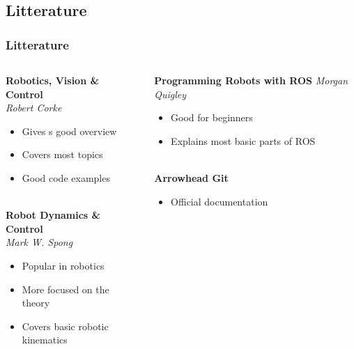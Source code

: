 \documentclass{beamer}
\begin{document}
\begin{frame}
    \subsection{Litterature}
    \frametitle{Litterature}

    \begin{columns}
        \begin{column}[]{0.5\textwidth}
            \textbf{Robotics, Vision \& Control }\\
            \textit{Robert Corke}
            \begin{itemize}
                \item Gives s good overview
                \item Covers most topics
                \item Good code examples\\~\
            \end{itemize}
            \textbf{Robot Dynamics \& Control}\\
            \textit{Mark W. Spong}
            \begin{itemize}
                \item Popular in robotics
                \item More focused on the theory
                \item Covers basic robotic kinematics
            \end{itemize}

        \end{column}
        
        \begin{column}[]{.5\textwidth}
            \textbf{Programming Robots with ROS}
            \textit{Morgan Quigley}
            \begin{itemize}
                \item Good for beginners
                \item Explains most basic parts of ROS \\~\
            \end{itemize}
            \textbf{Arrowhead Git}
            \begin{itemize}
                \item Official documentation
            \end{itemize}
        \end{column}
        

    \end{columns}
\end{frame}
\end{document}

